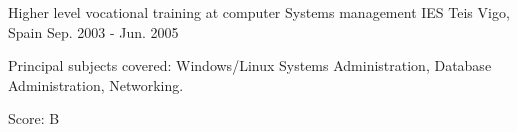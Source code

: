 \begin{cventries}
  \cventry
    {Higher level vocational training at computer Systems management} %
    {IES Teis} %
    {Vigo, Spain} %
    {Sep. 2003 - Jun. 2005} %
    {
      \begin{cvitems} %
	\item {Principal subjects covered: Windows/Linux Systems Administration, Database Administration, Networking.}
	\item {Score: B}
      \end{cvitems}
    }

\end{cventries}
